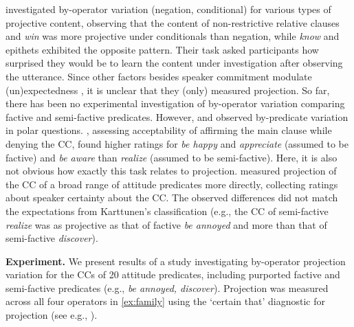 \documentclass[12pt, letterpaper]{article}
\begin{document}
	\citet{smith_relationship_2014} investigated by-operator variation (negation, conditional) for various types of projective content, observing that the content of non-restrictive relative clauses and \emph{win} was more projective under conditionals than negation, while \emph{know} and epithets exhibited the opposite pattern.
	Their task asked participants how surprised they would be to learn the content under investigation after observing the utterance. Since other factors besides speaker commitment modulate (un)expectedness \citep[see e.g.][]{zimmermann_grammatical_2011,tonnis_german_2021}, it is unclear that they (only) measured projection. So far, there has been no experimental investigation of by-operator variation comparing factive and semi-factive predicates. However, \citet{djarv_cognitive_2018} and \citet{tonhauser_how_2018} observed by-predicate variation in polar questions. \citet{djarv_cognitive_2018}, assessing acceptability of affirming the main clause while denying the CC, found higher ratings for \emph{be happy} and \emph{appreciate} (assumed to be factive) and \emph{be aware} than \emph{realize} (assumed to be semi-factive). Here, it is also not obvious how exactly this task relates to projection. \citet{tonhauser_how_2018} measured projection of the CC of a broad range of attitude predicates more directly, collecting ratings about speaker certainty about the CC. The observed differences did not match the expectations from Karttunen's classification (e.g., the CC of semi-factive \emph{realize} was as projective as that of factive \emph{be annoyed} and more than that of semi-factive \emph{discover}).

\noindent
{\bf Experiment.}
	We present results of a study investigating by-operator projection variation for the CCs of 20 attitude predicates, including purported factive and semi-factive predicates (e.g., \emph{be annoyed, discover}). Projection was measured  across all four operators in \ref{ex:family} using the `certain that' diagnostic for projection (see e.g., \citealp{tonhauser_how_2018,djarv_prosodic_2017,mahler_social_2020}).
\end{document}
